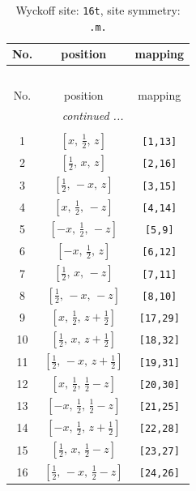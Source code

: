 \documentclass[fleqn,8pt]{jsarticle}
\begin{document}
\renewcommand{\arraystretch}{1.2}
\begin{longtable}{ccc}
\caption{Wyckoff site: {\tt 16t}, site symmetry: {\tt .m.}}
 \\
 \hline \hline
No. & position & mapping \\ \hline \endfirsthead

\multicolumn{2}{l}{\tablename\ \thetable{}} \\
 \hline \hline
No. & position & mapping \\ \hline \endhead

 \hline \hline
\multicolumn{2}{r}{\footnotesize\it continued ...} \\ \endfoot

 \hline \hline
\multicolumn{2}{r}{} \\ \endlastfoot

1 & $\left[ x,\, \frac{1}{2},\, z \right]$ & {\tt [1,13]} \\ \hline
2 & $\left[ \frac{1}{2},\, x,\, z \right]$ & {\tt [2,16]} \\ \hline
3 & $\left[ \frac{1}{2},\, - x,\, z \right]$ & {\tt [3,15]} \\ \hline
4 & $\left[ x,\, \frac{1}{2},\, - z \right]$ & {\tt [4,14]} \\ \hline
5 & $\left[ - x,\, \frac{1}{2},\, - z \right]$ & {\tt [5,9]} \\ \hline
6 & $\left[ - x,\, \frac{1}{2},\, z \right]$ & {\tt [6,12]} \\ \hline
7 & $\left[ \frac{1}{2},\, x,\, - z \right]$ & {\tt [7,11]} \\ \hline
8 & $\left[ \frac{1}{2},\, - x,\, - z \right]$ & {\tt [8,10]} \\ \hline
9 & $\left[ x,\, \frac{1}{2},\, z + \frac{1}{2} \right]$ & {\tt [17,29]} \\ \hline
10 & $\left[ \frac{1}{2},\, x,\, z + \frac{1}{2} \right]$ & {\tt [18,32]} \\ \hline
11 & $\left[ \frac{1}{2},\, - x,\, z + \frac{1}{2} \right]$ & {\tt [19,31]} \\ \hline
12 & $\left[ x,\, \frac{1}{2},\, \frac{1}{2} - z \right]$ & {\tt [20,30]} \\ \hline
13 & $\left[ - x,\, \frac{1}{2},\, \frac{1}{2} - z \right]$ & {\tt [21,25]} \\ \hline
14 & $\left[ - x,\, \frac{1}{2},\, z + \frac{1}{2} \right]$ & {\tt [22,28]} \\ \hline
15 & $\left[ \frac{1}{2},\, x,\, \frac{1}{2} - z \right]$ & {\tt [23,27]} \\ \hline
16 & $\left[ \frac{1}{2},\, - x,\, \frac{1}{2} - z \right]$ & {\tt [24,26]} \\
\end{longtable}
\end{document}
